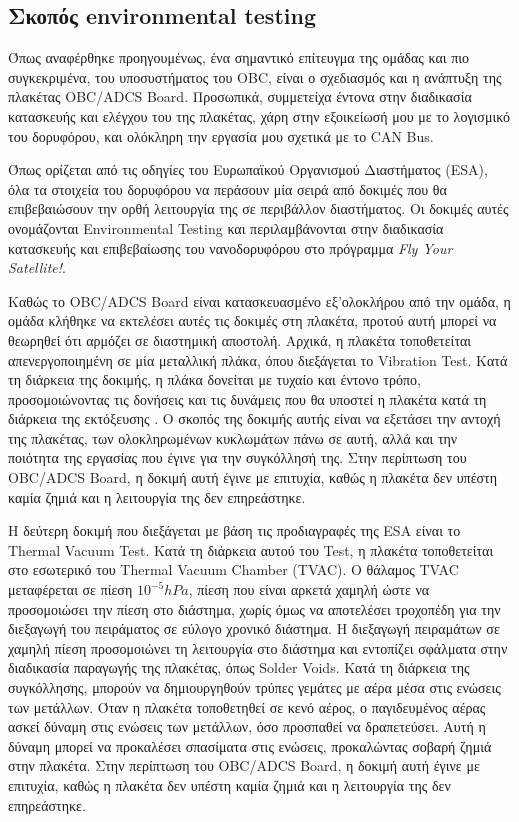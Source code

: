 \documentclass[a4paper,nobib,justified]{tufte-book}
\begin{document}
\subsection{Σκοπός environmental testing}
Όπως αναφέρθηκε προηγουμένως, ένα σημαντικό επίτευγμα της ομάδας και πιο συγκεκριμένα, του υποσυστήματος του OBC, είναι ο σχεδιασμός και η ανάπτυξη της πλακέτας OBC/ADCS Board. Προσωπικά, συμμετείχα έντονα στην διαδικασία κατασκευής και ελέγχου του της πλακέτας, χάρη στην εξοικείωσή μου με το λογισμικό του δορυφόρου, και ολόκληρη την εργασία μου σχετικά με το CAN Bus.

Όπως ορίζεται από τις οδηγίες του Ευρωπαϊκού Οργανισμού Διαστήματος (ESA), όλα τα στοιχεία του δορυφόρου να περάσουν μία σειρά από δοκιμές που θα επιβεβαιώσουν την ορθή λειτουργία της σε περιβάλλον διαστήματος. Οι δοκιμές αυτές ονομάζονται Environmental Testing και περιλαμβάνονται στην διαδικασία κατασκευής και επιβεβαίωσης του νανοδορυφόρου στο πρόγραμμα \textit{Fly Your Satellite!}.

Καθώς το OBC/ADCS Board είναι κατασκευασμένο εξ'ολοκλήρου από την ομάδα, η ομάδα κλήθηκε να εκτελέσει αυτές τις δοκιμές στη πλακέτα, προτού αυτή μπορεί να θεωρηθεί ότι αρμόζει σε διαστημική αποστολή. Αρχικά, η πλακέτα τοποθετείται απενεργοποιημένη σε μία μεταλλική πλάκα, όπου διεξάγεται το Vibration Test. Κατά τη διάρκεια της δοκιμής, η πλάκα δονείται με τυχαίο και έντονο τρόπο, προσομοιώνοντας τις δονήσεις και τις δυνάμεις που θα υποστεί η πλακέτα κατά τη διάρκεια της εκτόξευσης . Ο σκοπός της δοκιμής αυτής είναι να εξετάσει την αντοχή της πλακέτας, των ολοκληρωμένων κυκλωμάτων πάνω σε αυτή, αλλά και την ποιότητα της εργασίας που έγινε για την συγκόλλησή της. Στην περίπτωση του OBC/ADCS Board, η δοκιμή αυτή έγινε με επιτυχία, καθώς η πλακέτα δεν υπέστη καμία ζημιά και η λειτουργία της δεν επηρεάστηκε.

Η δεύτερη δοκιμή που διεξάγεται με βάση τις προδιαγραφές της ESA είναι το Thermal Vacuum Test. Κατά τη διάρκεια αυτού του Test, η πλακέτα τοποθετείται στο εσωτερικό του Thermal Vacuum Chamber (TVAC). Ο θάλαμος TVAC μεταφέρεται σε πίεση $10^{-5} hPa$, πίεση που είναι αρκετά χαμηλή ώστε να προσομοιώσει την πίεση στο διάστημα, χωρίς όμως να αποτελέσει τροχοπέδη για την διεξαγωγή του πειράματος σε εύλογο χρονικό διάστημα. Η διεξαγωγή πειραμάτων σε χαμηλή πίεση προσομοιώνει τη λειτουργία στο διάστημα και εντοπίζει σφάλματα στην διαδικασία παραγωγής της πλακέτας, όπως Solder Voids. Κατά τη διάρκεια της συγκόλλησης, μπορούν να δημιουργηθούν τρύπες γεμάτες με αέρα μέσα στις ενώσεις των μετάλλων. Όταν η πλακέτα τοποθετηθεί σε κενό αέρος, ο παγιδευμένος αέρας ασκεί δύναμη στις ενώσεις των μετάλλων, όσο προσπαθεί να δραπετεύσει. Αυτή η δύναμη μπορεί να προκαλέσει σπασίματα στις ενώσεις, προκαλώντας σοβαρή ζημιά στην πλακέτα. Στην περίπτωση του OBC/ADCS Board, η δοκιμή αυτή έγινε με επιτυχία, καθώς η πλακέτα δεν υπέστη καμία ζημιά και η λειτουργία της δεν επηρεάστηκε.
\end{document}
